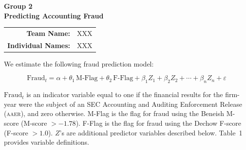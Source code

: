 \documentclass[12pt]{article}
\begin{document}
\begin{center}
  {\large\bfseries Group 2}\\[0.3em]
  {\large\bfseries Predicting Accounting Fraud}\\[1em]
  \begin{tabular}{rl}
    \textbf{Team Name:}       & XXX \\
    \textbf{Individual Names:}& XXX \\
  \end{tabular}
\end{center}

\bigskip


We estimate the following fraud prediction model:

\begin{equation}
  \text{Fraud}_{t} = \alpha
    + \theta_1\,\text{M-Flag}
    + \theta_2\,\text{F-Flag}
    + \beta_1 Z_1
    + \beta_2 Z_2
    + \cdots
    + \beta_n Z_n
    + \varepsilon
  \label{eq:fraud}
\end{equation}

\noindent
$\text{Fraud}_t$ is an indicator variable equal to one if the financial results for
the firm-year were the subject of an SEC Accounting and Auditing Enforcement Release
(\textsc{aaer}), and zero otherwise.
M-Flag is the flag for fraud using the Beneish M-score (M-score $> -1.78$).
F-Flag is the flag for fraud using the Dechow F-score (F-score $> 1.0$).
$Z$'s are additional predictor variables described below.
Table~1 provides variable definitions.

\end{document}
